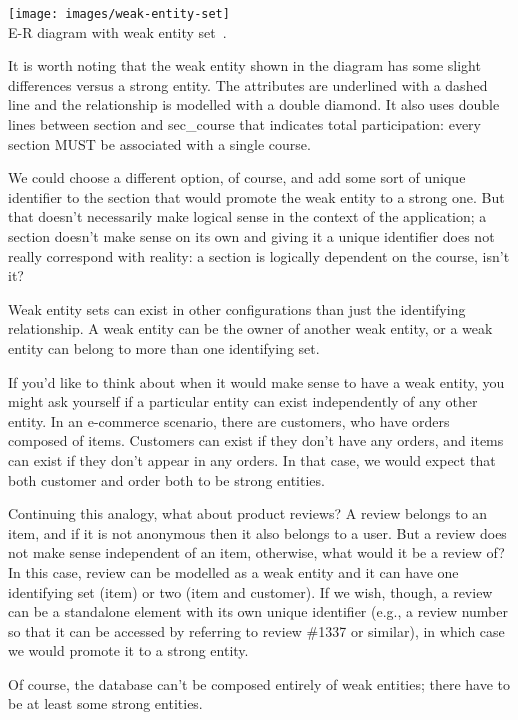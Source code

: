 \documentclass[a4paper]{report}
\begin{document}
\begin{center}
\texttt{[image: images/weak-entity-set]}\\
E-R diagram with weak entity set~\cite{dsc}.
\end{center}

It is worth noting that the weak entity shown in the diagram has some slight differences versus a strong entity. The attributes are underlined with a dashed line and the relationship is modelled with a double diamond. It also uses double lines between section and sec\_course that indicates total participation: every section MUST be associated with a single course.

We could choose a different option, of course, and add some sort of unique identifier to the section that would promote the weak entity to a strong one. But that doesn't necessarily make logical sense in the context of the application; a section doesn't make sense on its own and giving it a unique identifier does not really correspond with reality: a section is logically dependent on the course, isn't it?

Weak entity sets can exist in other configurations than just the identifying relationship. A weak entity can be the owner of another weak entity, or a weak entity can belong to more than one identifying set.

If you'd like to think about when it would make sense to have a weak entity, you might ask yourself if a particular entity can exist independently of any other entity. In an e-commerce scenario, there are customers, who have orders composed of items. Customers can exist if they don't have any orders, and items can exist if they don't appear in any orders. In that case, we would expect that both customer and order both to be strong entities.

Continuing this analogy, what about product reviews? A review belongs to an item, and if it is not anonymous then it also belongs to a user. But a review does not make sense independent of an item, otherwise, what would it be a review of? In this case, review can be modelled as a weak entity and it can have one identifying set (item) or two (item and customer). If we wish, though, a review can be a standalone element with its own unique identifier (e.g., a review number so that it can be accessed by referring to review \#1337 or similar), in which case we would promote it to a strong entity.

Of course, the database can't be composed entirely of weak entities; there have to be at least some strong entities. 
\end{document}
